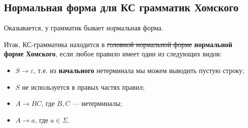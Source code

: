 \subsection{Нормальная форма для КС грамматик Хомского}
  Оказывается, у грамматик бывает нормальная форма.
  
\begin{conj}
  Итак, КС-грамматика находится в \sout{головной нормальной форме} \textbf{нормальной форме Хомского}, если любое правило имеет один из следующих видов:
  \begin{itemize}
    \item $S \to \varepsilon$, т.е. из \textbf{начального} нетерминала мы можем выводить пустую строку;
    \item $S$ не используется в правых частях правил;
    \item $A \to BC$, где $B, C$ --- нетерминалы;
    \item $A \to a$, где $a \in \Sigma$.
  \end{itemize}
\end{conj}

